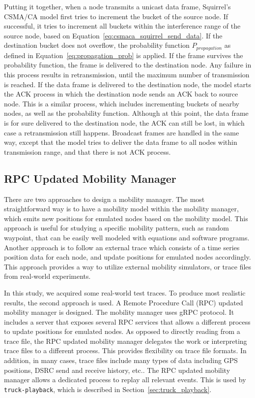 \documentclass[12pt]{report}
\begin{document}
Putting it together, when a node transmits a unicast data frame, Squirrel's CSMA/CA model first tries to increment the bucket of the source node. If successful, it tries to increment all buckets within the interference range of the source node, based on Equation~\ref{eq:csmaca_squirrel_send_data}. If the destination bucket does not overflow, the probability function $P_{propagation}$ as defined in Equation~\ref{eq:propagation_prob} is applied. If the frame survives the probability function, the frame is delivered to the destination node. Any failure in this process results in retransmission, until the maximum number of transmission is reached. If the data frame is delivered to the destination node, the model starts the ACK process in which the destination node sends an ACK back to source node. This is a similar process, which includes incrementing buckets of nearby nodes, as well as the probability function. Although at this point, the data frame is for sure delivered to the destination node, the ACK can still be lost, in which case a retransmission still happens. Broadcast frames are handled in the same way, except that the model tries to deliver the data frame to all nodes within transmission range, and that there is not ACK process.


\subsection{RPC Updated Mobility Manager}
\label{sec:rpc_mobility_manager}

There are two approaches to design a mobility manager. The most straightforward way is to have a mobility model within the mobility manager, which emits new positions for emulated nodes based on the mobility model. This approach is useful for studying a specific mobility pattern, such as random waypoint, that can be easily well modeled with equations and software programs. Another approach is to follow an external trace which consists of a time series position data for each node, and update positions for emulated nodes accordingly. This approach provides a way to utilize external mobility simulators, or trace files from real-world experiments.

In this study, we acquired some real-world test traces. To produce most realistic results, the second approach is used. A Remote Procedure Call (RPC) updated mobility manager is designed. The mobility manager uses gRPC \cite{grpc} protocol. It includes a server that exposes several RPC services that allows a different process to update positions for emulated nodes. As opposed to directly reading from a trace file, the RPC updated mobility manager delegates the work or interpreting trace files to a different process. This provides flexibility on trace file formats. In addition, in many cases, trace files include many types of data including GPS positions, DSRC send and receive history, etc.. The RPC updated mobility manager allows a dedicated process to replay all relevant events. This is used by \texttt{truck-playback}, which is described in Section~\ref{sec:truck_playback}.
\end{document}
